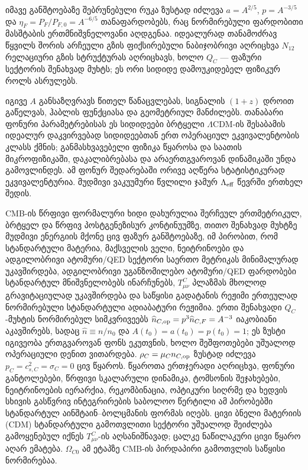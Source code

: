 \documentclass[11pt,a4paper]{article}
\begin{document}
\begin{enumerate}[label=\arabic*.]
იმავე განშტოებაზე შებრუნებული რუკა ზუსტად იძლევა $a=A^{2/5}$, $p=A^{-3/5}$ და $\eta_F=P_F/P_{F,0}=A^{-6/5}$ თანაფარდობებს, რაც ნორმირებული ფარდობითი მასშტაბის ერთმნიშვნელოვანი აღდგენაა. იდეალურად თანამოძრავ წყვილს შორის არჩეული გზის ფიქსირებული ნაბიჯობრივი აღრიცხვა $N_{12}$ რელაციური გზის სტრუქტურას აღრიცხავს, ხოლო $Q_C$ — ფაზური სექტორის შენახვად მუხტს; ეს ორი სიდიდე დამოუკიდებელ ფიზიკურ როლს ასრულებს.

იგივე $A$ განსაზღვრავს წითელ წანაცვლებას, სიგნალის $(1+z)$ დროით გაწელვას, ჰაბლის ფუნქციასა და გეომეტრიულ მანძილებს. თანაბარი ფონური პარამეტრებისას ეს სიდიდეები ბრტყელი $\Lambda$CDM-ის შესაბამის იდეალურ დაკვირვებად სიდიდეებთან ერთ ოპერაციულ ეკვივალენტობის კლასს ქმნის; განმასხვავებელი ფიზიკა წყაროსა და საათის მიკროფიზიკაში, დაკალიბრებასა და არაერთგვაროვან დინამიკაში უნდა გამოვლინდეს. ამ ფონურ შედარებაში ორივე აღწერა სტატისტიკურად ეკვივალენტურია. მუდმივი ვაკუუმური წვლილი ჯამურ $\Lambda_{\rm eff}$ წევრში ერთხელ შედის.

CMB-ის წრფივი ფორმალური ხიდი დახურულია შერჩეულ ერთმეტრიკულ, ბრტყელ და წრფივ პოსტგენეზისურ კონტინუუმზე, თითო შენახვად მუხტზე მუდმივი ენერგიის მქონე ცივ ფაზურ განშტოებაზე, იმ პირობით, რომ სტანდარტული მატერია, მაქსველის ველი, ნეიტრინოები და ადგილობრივი ატომური/QED სექტორი საერთო მეტრიკას მინიმალურად უკავშირდება, ადგილობრივი უგანზომილებო ატომური/QED ფარდობები სტანდარტულ მნიშვნელობებს ინარჩუნებს, $T^C_{\mu\nu}$ პლაზმას მხოლოდ გრავიტაციულად უკავშირდება და საწყისი გადატანის რეჟიმი ერთეულად ნორმირებული სტანდარტული ადიაბატური რეჟიმია. ერთი შენახვადი $Q_C$-მუხტის ნორმირებულ სიმკვრივეებს $\widehat n_{C,{\rm op}}=p^3\widehat n_{C,F}=A^{-3}$ იაკობიანი აკავშირებს, სადაც $\widehat n\equiv n/n_0$ და $A(t_0)=a(t_0)=p(t_0)=1$; ეს ზუსტი იგივეობა ერთგვაროვან ფონს ეკუთვნის, ხოლო შეშფოთებები უშუალოდ ოპერაციული დენით ვითარდება. $\rho_C=\mu_Cn_{C,{\rm op}}$ ზუსტად იძლევა $p_C=c_{s,C}^2=\sigma_C=0$ ცივ წყაროს. წყაროთა ერთჯერადი აღრიცხვა, ფონური განტოლებები, წრფივი სკალარული დინამიკა, ტომსონის შეჯახებები, ნეიტრინოების იერარქია, რეკომბინაცია, ოპტიკური სიღრმე და ხედვის სხივის გასწვრივ ინტეგრირების საბოლოო წერტილი ამ პირობებში სტანდარტულ აინშტაინ–ბოლცმანის ფორმას იღებს. ცივი ბნელი მატერიის (CDM) სტანდარტული გამოთვლითი სექტორი უშუალოდ შეიძლება გამოყენებულ იქნეს $T^C_{\mu\nu}$-ის აღსანიშნავად; ცალკე ნაწილაკური ცივი წყარო აღარ ემატება. $\Omega_{C0}$ ამ ეტაპზე CMB-ის პირდაპირი გამოთვლის საწყისი ნორმირებაა.


\end{enumerate}
\end{document}

